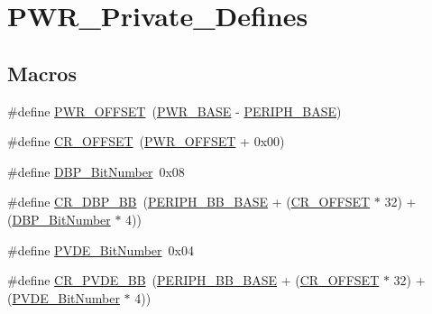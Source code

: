 \hypertarget{group___p_w_r___private___defines}{}\section{P\+W\+R\+\_\+\+Private\+\_\+\+Defines}
\label{group___p_w_r___private___defines}
\subsection*{Macros}
\begin{DoxyCompactItemize}
\item 
\#define \hyperlink{group___p_w_r___private___defines_ga7f88bce73931300319824f22578f90de}{P\+W\+R\+\_\+\+O\+F\+F\+S\+ET}~(\hyperlink{openmotestm_2library_2inc_2stm32f10x__map_8h_ac691ec23dace8b7a649a25acb110217a}{P\+W\+R\+\_\+\+B\+A\+SE} -\/ \hyperlink{openmotestm_2library_2inc_2stm32f10x__map_8h_a9171f49478fa86d932f89e78e73b88b0}{P\+E\+R\+I\+P\+H\+\_\+\+B\+A\+SE})
\item 
\#define \hyperlink{group___p_w_r___private___defines_gafa1d3d0ea72132df651c76fc1bdffffc}{C\+R\+\_\+\+O\+F\+F\+S\+ET}~(\hyperlink{openmotestm_2library_2src_2stm32f10x__pwr_8c_a7f88bce73931300319824f22578f90de}{P\+W\+R\+\_\+\+O\+F\+F\+S\+ET} + 0x00)
\item 
\#define \hyperlink{group___p_w_r___private___defines_ga36ff45d972bf94f31f172fd53cf44d23}{D\+B\+P\+\_\+\+Bit\+Number}~0x08
\item 
\#define \hyperlink{group___p_w_r___private___defines_ga799ab60bdbcfc1076cf2d7f206d09b0c}{C\+R\+\_\+\+D\+B\+P\+\_\+\+BB}~(\hyperlink{openmotestm_2library_2inc_2stm32f10x__map_8h_aed7efc100877000845c236ccdc9e144a}{P\+E\+R\+I\+P\+H\+\_\+\+B\+B\+\_\+\+B\+A\+SE} + (\hyperlink{openmotestm_2library_2src_2stm32f10x__rcc_8c_afa1d3d0ea72132df651c76fc1bdffffc}{C\+R\+\_\+\+O\+F\+F\+S\+ET} $\ast$ 32) + (\hyperlink{openmotestm_2library_2src_2stm32f10x__pwr_8c_a36ff45d972bf94f31f172fd53cf44d23}{D\+B\+P\+\_\+\+Bit\+Number} $\ast$ 4))
\item 
\#define \hyperlink{group___p_w_r___private___defines_ga17d618eb800c401ef9c6789c9374eaf8}{P\+V\+D\+E\+\_\+\+Bit\+Number}~0x04
\item 
\#define \hyperlink{group___p_w_r___private___defines_ga49f51ef8285a6be76fd204d49a00709c}{C\+R\+\_\+\+P\+V\+D\+E\+\_\+\+BB}~(\hyperlink{openmotestm_2library_2inc_2stm32f10x__map_8h_aed7efc100877000845c236ccdc9e144a}{P\+E\+R\+I\+P\+H\+\_\+\+B\+B\+\_\+\+B\+A\+SE} + (\hyperlink{openmotestm_2library_2src_2stm32f10x__rcc_8c_afa1d3d0ea72132df651c76fc1bdffffc}{C\+R\+\_\+\+O\+F\+F\+S\+ET} $\ast$ 32) + (\hyperlink{openmotestm_2library_2src_2stm32f10x__pwr_8c_a17d618eb800c401ef9c6789c9374eaf8}{P\+V\+D\+E\+\_\+\+Bit\+Number} $\ast$ 4))

\end{DoxyCompactItemize}
